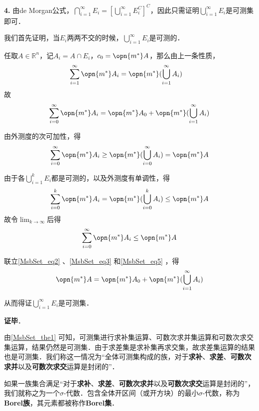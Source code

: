 \textbf{4.} 由de Morgan公式，$\bigcap_{i=1}^\infty E_i=[\bigcup_{i=1}^\infty E_i^C]^C$，因此只需证明$\bigcup_{i=1}^\infty E_i$是可测集即可．

我们首先证明，当$E_i$两两不交的时候，$\bigcup^\infty_{i=1}E_i$是可测的．

任取$A\in\mathbb{R}^n$，记$A_i=A\cap E_i$，$c_0=\opn{m^*}A$，那么由上一条性质，
\begin{equation}
\begin{aligned}
\sum^\infty_{i=1}\opn{m^*}A_i&=\opn{m^*}(\bigcup_{i=1}^\infty A_i)
\end{aligned}
\end{equation}
故
\begin{equation}\label{MsbSet_eq2}
\sum^\infty_{i=0}\opn{m^*}A_i=\opn{m^*}A_0+\opn{m^*}(\bigcup_{i=1}^\infty A_i)
\end{equation}


由外测度的次可加性，得
\begin{equation}\label{MsbSet_eq3}
\sum_{i=0}^\infty\opn{m^*}A_i\geq \opn{m^*}(\bigcup_{i=0}^\infty A_i)=\opn{m^*}A
\end{equation}

由于各$\bigcup_{i=1}^k E_i$都是可测的，以及外测度有单调性，得
\begin{equation}
\sum_{i=0}^k\opn{m^*}A_i=\opn{m^*}(\bigcup_{i=0}^k A_i)\leq \opn{m^*}A
\end{equation}
故令$\lim_{k\to \infty}$后得
\begin{equation}\label{MsbSet_eq5}
\sum_{i=0}^\infty\opn{m^*}A_i\leq \opn{m^*}A
\end{equation}

联立\autoref{MsbSet_eq2} 、\autoref{MsbSet_eq3} 和\autoref{MsbSet_eq5} ，得
\begin{equation}
\opn{m^*}A=\opn{m^*}A_0+\opn{m^*}(\bigcup_{i=1}^\infty A_i)
\end{equation}

从而得证$\bigcup_{i=1}^\infty E_i$是可测集．




\textbf{证毕}．


由\autoref{MsbSet_the1} 可知，可测集进行求补集运算、可数次求并集运算和可数次求交集运算，结果仍然是可测集．由于求差集是求补集再求交集，故求差集运算的结果也是可测集．我们称这一情况为“全体可测集构成的族，对于\textbf{求补}、\textbf{求差}、\textbf{可数次求并}以及\textbf{可数次求交}运算是封闭的”．

\begin{definition}{}
如果一族集合满足“对于\textbf{求补}、\textbf{求差}、\textbf{可数次求并}以及\textbf{可数次求交}运算是封闭的”，我们就称之为一个$\sigma$-代数．包含全体开区间（或开方块）的最小$\sigma$-代数，称为\textbf{Borel族}，其元素都被称作\textbf{Borel集}．
\end{definition}

